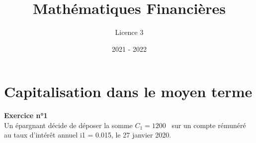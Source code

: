 \documentclass{article}
\title{Mathématiques Financières}
\author{Licence 3}
\date{2021 - 2022}
\begin{document}
\normalsize
\maketitle

\renewcommand*\contentsname{Table des matières}
\newpage

\section{Capitalisation dans le moyen terme}
\textcolor{exogris}{\textbf{Exercice n°1}
\\Un épargnant décide de déposer la somme $C_1 = 1200$ \texteuro sur un compte rémunéré au taux
d’intérêt annuel i1 = 0.015, le 27 janvier 2020.}
\end{document}
